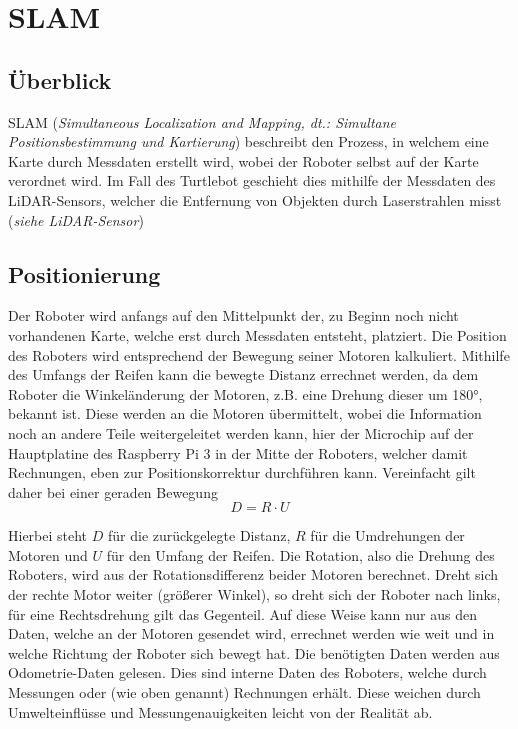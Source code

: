 \section{SLAM}
{
	\subsection{Überblick}
	{
		SLAM (\textit{Simultaneous Localization and Mapping, dt.: Simultane Positionsbestimmung und Kartierung}) beschreibt den Prozess, in welchem eine Karte durch Messdaten erstellt wird, wobei der Roboter selbst auf der Karte verordnet wird.
		Im Fall des Turtlebot geschieht dies mithilfe der Messdaten des LiDAR-Sensors, welcher die Entfernung von Objekten durch Laserstrahlen misst (\textit{siehe LiDAR-Sensor})	
	}

	\subsection{Positionierung}
	{
		Der Roboter wird anfangs auf den Mittelpunkt der, zu Beginn noch nicht vorhandenen Karte, welche erst durch Messdaten entsteht, platziert. Die Position des Roboters wird entsprechend der Bewegung seiner Motoren kalkuliert. Mithilfe des Umfangs der Reifen kann die bewegte Distanz errechnet werden, da dem Roboter die Winkeländerung der Motoren, z.B. eine Drehung dieser um 180°, bekannt ist. Diese werden an die Motoren übermittelt, wobei die Information noch an andere Teile weitergeleitet werden kann, hier der Microchip auf der Hauptplatine des Raspberry Pi 3 in der Mitte der Roboters, welcher damit Rechnungen, eben zur Positionskorrektur durchführen kann. Vereinfacht gilt daher bei einer geraden Bewegung
		\begin{equation}
			D = R \cdot U
		\end{equation} 
		
		Hierbei steht $D$ für die zurückgelegte Distanz, $R$ für die Umdrehungen der Motoren und $U$ für den Umfang der Reifen. Die Rotation, also die Drehung des Roboters, wird aus der Rotationsdifferenz beider Motoren berechnet. Dreht sich der rechte Motor weiter (größerer Winkel), so dreht sich der Roboter nach links, für eine Rechtsdrehung gilt das Gegenteil.
		Auf diese Weise kann nur aus den Daten, welche an der Motoren gesendet wird, errechnet werden wie weit und in welche Richtung der Roboter sich bewegt hat.
		Die benötigten Daten werden aus Odometrie-Daten gelesen. Dies sind interne Daten des Roboters, welche durch Messungen oder (wie oben genannt) Rechnungen erhält. Diese weichen durch Umwelteinflüsse und Messungenauigkeiten leicht von der Realität ab.
		
}}
